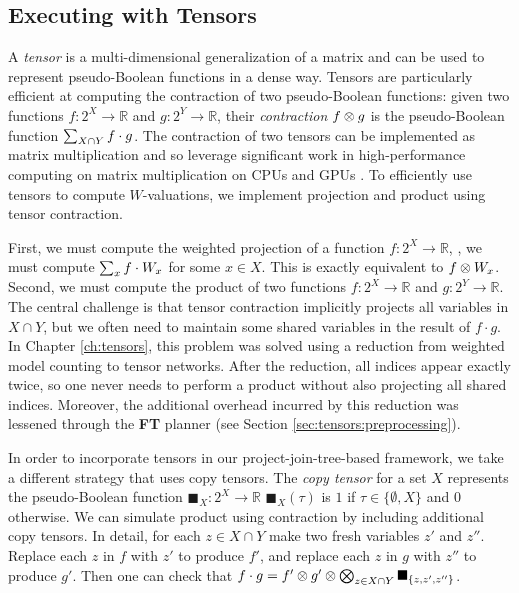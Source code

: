 \subsection{Executing with Tensors}

A \emph{tensor} is a multi-dimensional generalization of a matrix and can be used to represent pseudo-Boolean functions in a dense way.
Tensors are particularly efficient at computing the contraction of two pseudo-Boolean functions: given two functions $f: 2^X \to \mathbb{R}$ and $g: 2^Y \to \mathbb{R}$, their \emph{contraction} $f \otimes g$ is the pseudo-Boolean function $\sum_{X \cap Y} f \cdot g$.
The contraction of two tensors can be implemented as matrix multiplication and so leverage significant work in high-performance computing on matrix multiplication on CPUs \cite{LHKK77} and GPUs \cite{FSH04}.
To efficiently use tensors to compute $W$-valuations, we implement projection and product using tensor contraction.

First, we must compute the weighted projection of a function $f: 2^X \to \mathbb{R}$, \ie, we must compute $\sum_x f \cdot W_x$ for some $x \in X$.
This is exactly equivalent to $f \otimes W_x$.
Second, we must compute the product of two functions $f: 2^X \to \mathbb{R}$ and $g: 2^Y \to \mathbb{R}$.
The central challenge is that tensor contraction implicitly projects all variables in $X \cap Y$, but we often need to maintain some shared variables in the result of $f \cdot g$.
In Chapter \ref{ch:tensors}, this problem was solved using a reduction from weighted model counting to tensor networks.
After the reduction, all indices appear exactly twice, so one never needs to perform a product without also projecting all shared indices.
Moreover, the additional overhead incurred by this reduction was lessened through the \textbf{FT} planner (see Section \ref{sec:tensors:preprocessing}).

In order to incorporate tensors in our project-join-tree-based framework, we take a different strategy that uses copy tensors.
The \emph{copy tensor} for a set $X$ represents the pseudo-Boolean function $\blacksquare_X: 2^X \to \mathbb{R}$ \st{} $\blacksquare_X(\tau)$ is $1$ if $\tau \in \{ \emptyset, X \}$ and $0$ otherwise.
We can simulate product using contraction by including additional copy tensors.
In detail, for each $z \in X \cap Y$ make two fresh variables $z'$ and $z''$.
Replace each $z$ in $f$ with $z'$ to produce $f'$, and replace each $z$ in $g$ with $z''$ to produce $g'$.
Then one can check that $f \cdot g = f' \otimes g' \otimes \bigotimes_{z \in X \cap Y} \blacksquare_{\{z, z', z''\}}$.

